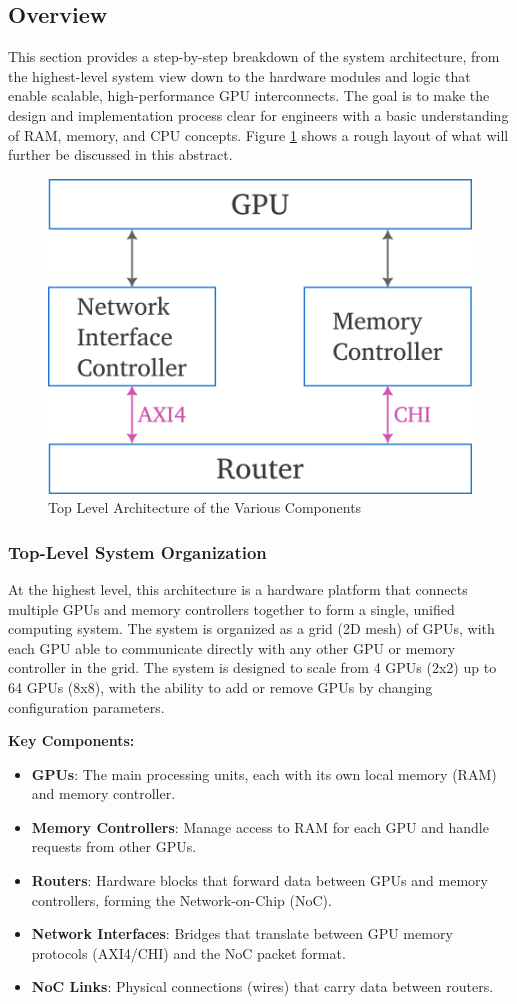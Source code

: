 \documentclass[11pt,a4paper]{article}
\begin{document}
\subsection*{Overview}
This section provides a step-by-step breakdown of the system architecture, from the highest-level system view down to the hardware modules and logic that enable scalable, high-performance GPU interconnects. The goal is to make the design and implementation process clear for engineers with a basic understanding of RAM, memory, and CPU concepts. Figure \ref{fig:top architecture} shows a rough layout of what will further be discussed in this abstract.
\begin{figure}[h!]
	\centering
	\includegraphics[width=0.45\linewidth]{images/component-architecture.png}
	\caption{Top Level Architecture of the Various Components}
	\label{fig:top architecture}
\end{figure}

\subsubsection{Top-Level System Organization}
At the highest level, this architecture is a hardware platform that connects multiple GPUs and memory controllers together to form a single, unified computing system. The system is organized as a grid (2D mesh) of GPUs, with each GPU able to communicate directly with any other GPU or memory controller in the grid. The system is designed to scale from 4 GPUs (2x2) up to 64 GPUs (8x8), with the ability to add or remove GPUs by changing configuration parameters.

\textbf{Key Components:}
\begin{itemize}
    \item \textbf{GPUs}: The main processing units, each with its own local memory (RAM) and memory controller.
    \item \textbf{Memory Controllers}: Manage access to RAM for each GPU and handle requests from other GPUs.
    \item \textbf{Routers}: Hardware blocks that forward data between GPUs and memory controllers, forming the Network-on-Chip (NoC).
    \item \textbf{Network Interfaces}: Bridges that translate between GPU memory protocols (AXI4/CHI) and the NoC packet format.
    \item \textbf{NoC Links}: Physical connections (wires) that carry data between routers.
\end{itemize}
\end{document}
